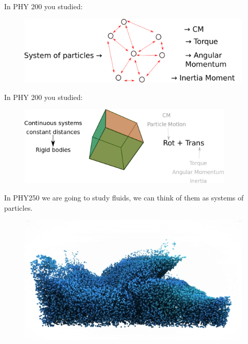 \documentclass[]{beamer}
\begin{document}
\begin{frame}

  In PHY 200 you studied:

  \begin{figure}[h!]
    \begin{center}
      \includegraphics[height=1.in]{images/rev2.png}
    \end{center}
  \end{figure}


\end{frame}

\begin{frame}

  In PHY 200 you studied:

  \begin{figure}[h!]
    \begin{center}
      \includegraphics[height=1.5in]{images/rev3.png}
    \end{center}
  \end{figure}


\end{frame}


\begin{frame}

In PHY250 we are going to study fluids, we can think of them as systems of particles.

  \begin{figure}[h!]
    \begin{center}
      \includegraphics[height=2.in]{images/particles_fluid.jpg}
    \end{center}
  \end{figure}
      


\end{frame}
\end{document}
